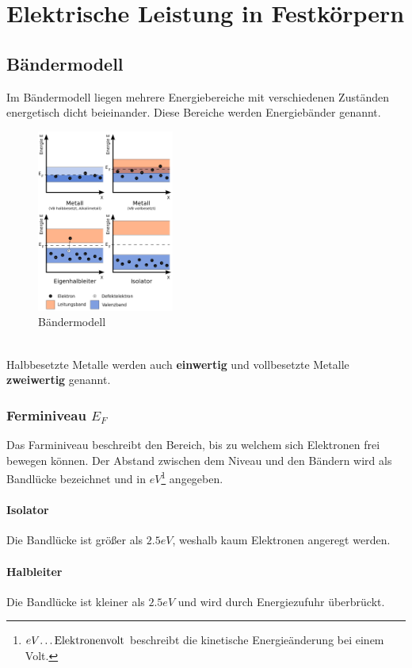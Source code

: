 \documentclass[a4paper,11pt]{article}
\begin{document}
\newpage
\section{Elektrische Leistung in Festkörpern}
\subsection{Bändermodell}
Im Bändermodell liegen mehrere Energiebereiche mit verschiedenen Zuständen energetisch dicht beieinander.
Diese Bereiche werden Energiebänder genannt.

\begin{figure}[!ht]
\centering
\includegraphics[width=0.4\textwidth]{baendermodell.png}
\caption[https://de.wikipedia.org/wiki/Bändermodell]{Bändermodell}
\end{figure}
~\\
Halbbesetzte Metalle werden auch \textbf{einwertig} und vollbesetzte Metalle \textbf{zweiwertig} genannt.

\subsubsection[Ferminiveau]{Ferminiveau $E_F$}
Das Farminiveau beschreibt den Bereich, bis zu welchem sich Elektronen frei bewegen können.
Der Abstand zwischen dem Niveau und den Bändern wird als Bandlücke bezeichnet und in $eV$\footnote{$eV \text{\dots Elektronenvolt}$ beschreibt die kinetische Energieänderung bei einem Volt.} angegeben.
\paragraph{Isolator}
Die Bandlücke ist größer als $2.5eV$, weshalb kaum Elektronen angeregt werden.
\paragraph{Halbleiter}
Die Bandlücke ist kleiner als $2.5eV$ und wird durch Energiezufuhr überbrückt.
\end{document}
